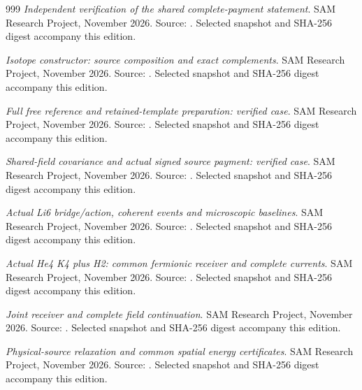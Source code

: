 \begin{thebibliography}{999}
\emph{Independent verification of the shared complete-payment statement}. SAM Research Project, November 2026.
Source: . Selected snapshot and SHA-256 digest accompany this edition.

\emph{Isotope constructor: source composition and exact complements}. SAM Research Project, November 2026.
Source: . Selected snapshot and SHA-256 digest accompany this edition.

\emph{Full free reference and retained-template preparation: verified case}. SAM Research Project, November 2026.
Source: . Selected snapshot and SHA-256 digest accompany this edition.

\emph{Shared-field covariance and actual signed source payment: verified case}. SAM Research Project, November 2026.
Source: . Selected snapshot and SHA-256 digest accompany this edition.

\emph{Actual Li6 bridge/action, coherent events and microscopic baselines}. SAM Research Project, November 2026.
Source: . Selected snapshot and SHA-256 digest accompany this edition.

\emph{Actual He4 K4 plus H2: common fermionic receiver and complete currents}. SAM Research Project, November 2026.
Source: . Selected snapshot and SHA-256 digest accompany this edition.

\emph{Joint receiver and complete field continuation}. SAM Research Project, November 2026.
Source: . Selected snapshot and SHA-256 digest accompany this edition.

\emph{Physical-source relaxation and common spatial energy certificates}. SAM Research Project, November 2026.
Source: . Selected snapshot and SHA-256 digest accompany this edition.


\end{thebibliography}

